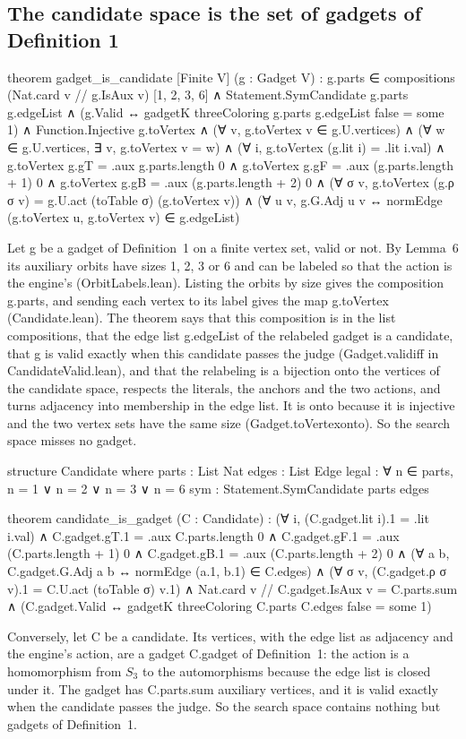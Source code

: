 \documentclass[11pt,a4paper]{article}
\newcommand{\leanus}{\textunderscore\allowbreak}
\newcommand{\lean}[1]{{\ttfamily\let\_\leanus #1}}
\begin{document}
\subsection{The candidate space is the set of gadgets of Definition 1}
\begin{code}
theorem gadget_is_candidate [Finite V] (g : Gadget V) :
    g.parts ∈ compositions (Nat.card {v // g.IsAux v}) [1, 2, 3, 6] ∧
    Statement.SymCandidate g.parts g.edgeList ∧
    (g.Valid ↔ gadgetK threeColoring g.parts g.edgeList false = some 1) ∧
    Function.Injective g.toVertex ∧
    (∀ v, g.toVertex v ∈ g.U.vertices) ∧
    (∀ w ∈ g.U.vertices, ∃ v, g.toVertex v = w) ∧
    (∀ i, g.toVertex (g.lit i) = .lit i.val) ∧
    g.toVertex g.gT = .aux g.parts.length 0 ∧
    g.toVertex g.gF = .aux (g.parts.length + 1) 0 ∧
    g.toVertex g.gB = .aux (g.parts.length + 2) 0 ∧
    (∀ σ v, g.toVertex (g.ρ σ v) = g.U.act (toTable σ) (g.toVertex v)) ∧
    (∀ u v, g.G.Adj u v ↔ normEdge (g.toVertex u, g.toVertex v) ∈ g.edgeList)
\end{code}
Let \lean{g} be a gadget of Definition~1 on a finite vertex set, valid or
not. By Lemma~6 its auxiliary orbits have sizes 1, 2, 3 or 6 and can be
labeled so that the action is the engine's (\lean{OrbitLabels.lean}).
Listing the orbits by size gives the composition \lean{g.parts}, and sending
each vertex to its label gives the map \lean{g.toVertex}
(\lean{Candidate.lean}). The theorem says that this composition is in the
list \lean{compositions}, that the edge list \lean{g.edgeList} of the
relabeled gadget is a candidate, that \lean{g} is valid exactly when this
candidate passes the judge (\lean{Gadget.valid\_iff} in
\lean{CandidateValid.lean}), and that the relabeling is a bijection onto the
vertices of the candidate space, respects the literals, the anchors and the
two actions, and turns adjacency into membership in the edge list. It is
onto because it is injective and the two vertex sets have the same size
(\lean{Gadget.toVertex\_onto}). So the search space misses no gadget.
\begin{code}
structure Candidate where
  parts : List Nat
  edges : List Edge
  legal : ∀ n ∈ parts, n = 1 ∨ n = 2 ∨ n = 3 ∨ n = 6
  sym : Statement.SymCandidate parts edges

theorem candidate_is_gadget (C : Candidate) :
    (∀ i, (C.gadget.lit i).1 = .lit i.val) ∧
    C.gadget.gT.1 = .aux C.parts.length 0 ∧
    C.gadget.gF.1 = .aux (C.parts.length + 1) 0 ∧
    C.gadget.gB.1 = .aux (C.parts.length + 2) 0 ∧
    (∀ a b, C.gadget.G.Adj a b ↔ normEdge (a.1, b.1) ∈ C.edges) ∧
    (∀ σ v, (C.gadget.ρ σ v).1 = C.U.act (toTable σ) v.1) ∧
    Nat.card {v // C.gadget.IsAux v} = C.parts.sum ∧
    (C.gadget.Valid ↔ gadgetK threeColoring C.parts C.edges false = some 1)
\end{code}
Conversely, let \lean{C} be a candidate. Its vertices, with the edge list as
adjacency and the engine's action, are a gadget \lean{C.gadget} of
Definition~1: the action is a homomorphism from $S_3$ to the automorphisms
because the edge list is closed under it. The gadget has
\lean{C.parts.sum} auxiliary vertices, and it is valid exactly when the
candidate passes the judge. So the search space contains nothing but gadgets
of Definition~1.
\end{document}
